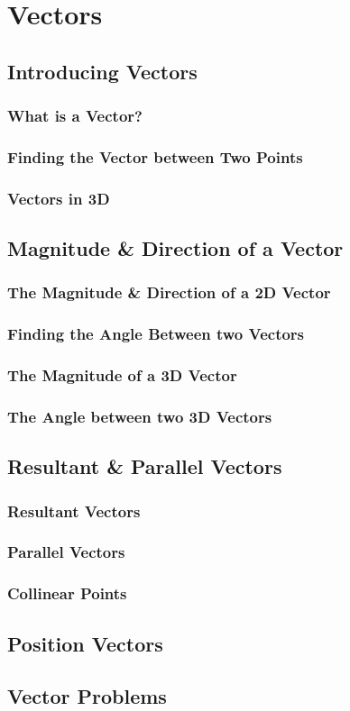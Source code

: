 \documentclass[../maths.tex]{subfiles}
\begin{document}
\chapter{Vectors}
\section{Introducing Vectors}
\subsection*{What is a Vector?}
\subsection*{Finding the Vector between Two Points}
\subsection*{Vectors in 3D}
\section{Magnitude \& Direction of a Vector}
\subsection*{The Magnitude \& Direction of a 2D Vector}
\subsection*{Finding the Angle Between two Vectors}
\subsection*{The Magnitude of a 3D Vector}
\subsection*{The Angle between two 3D Vectors}
\section{Resultant \& Parallel Vectors}
\subsection*{Resultant Vectors}
\subsection*{Parallel Vectors}
\subsection*{Collinear Points}
\section{Position Vectors}
\section{Vector Problems}
\end{document}
